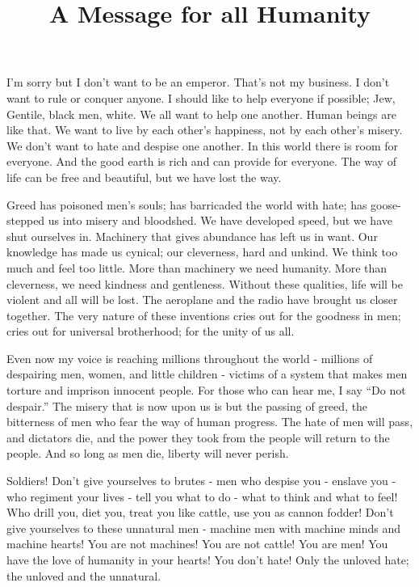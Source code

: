 \documentclass[12pt, a4paper]{article}
\title{\vspace{-6ex} A Message for all Humanity \cite{charlie}}
\date{\vspace{-8ex}}
\begin{document}
\maketitle

I'm sorry but I don't want to be an emperor. That's not my business. I don't want to rule or conquer anyone. I should like to help everyone if possible; Jew, Gentile, black men, white. We all want to help one another. Human beings are like that. We want to live by each other's happiness, not by each other's misery. We don't want to hate and despise one another. In this world there is room for everyone. And the good earth is rich and can provide for everyone. The way of life can be free and beautiful, but we have lost the way.

Greed has poisoned men's souls; has barricaded the world with hate; has goose-stepped us into misery and bloodshed. We have developed speed, but we have shut ourselves in. Machinery that gives abundance has left us in want. Our knowledge has made us cynical; our cleverness, hard and unkind. We think too much and feel too little. More than machinery we need humanity. More than cleverness, we need kindness and gentleness. Without these qualities, life will be violent and all will be lost. The aeroplane and the radio have brought us closer together. The very nature of these inventions cries out for the goodness in men; cries out for universal brotherhood; for the unity of us all.

Even now my voice is reaching millions throughout the world - millions of despairing men, women, and little children - victims of a system that makes men torture and imprison innocent people. For those who can hear me, I say ``Do not despair.'' The misery that is now upon us is but the passing of greed, the bitterness of men who fear the way of human progress. The hate of men will pass, and dictators die, and the power they took from the people will return to the people. And so long as men die, liberty will never perish.

Soldiers! Don't give yourselves to brutes - men who despise you - enslave you - who regiment your lives - tell you what to do - what to think and what to feel! Who drill you, diet you, treat you like cattle, use you as cannon fodder! Don't give yourselves to these unnatural men - machine men with machine minds and machine hearts! You are not machines! You are not cattle! You are men! You have the love of humanity in your hearts! You don't hate! Only the unloved hate; the unloved and the unnatural.
\end{document}
